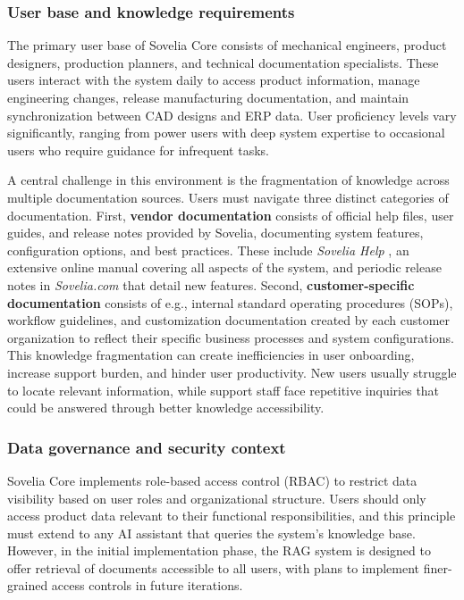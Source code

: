 \subsubsection{User base and knowledge requirements}

The primary user base of Sovelia Core consists of mechanical engineers, product designers, production planners, and technical documentation specialists. These users interact with the system daily to access product information, manage engineering changes, release manufacturing documentation, and maintain synchronization between CAD designs and ERP data. User proficiency levels vary significantly, ranging from power users with deep system expertise to occasional users who require guidance for infrequent tasks.

A central challenge in this environment is the fragmentation of knowledge across multiple documentation sources. Users must navigate three distinct categories of documentation. First, \textbf{vendor documentation} consists of official help files, user guides, and release notes provided by Sovelia, documenting system features, configuration options, and best practices. These include \textit{Sovelia Help} \parencite{noauthor_sovelia_nodate}, an extensive online manual covering all aspects of the system, and periodic release notes in \textit{Sovelia.com} \parencite{noauthor_digital_nodate} that detail new features. Second, \textbf{customer-specific documentation} consists of e.g., internal standard operating procedures (SOPs), workflow guidelines, and customization documentation created by each customer organization to reflect their specific business processes and system configurations. This knowledge fragmentation can create inefficiencies in user onboarding, increase support burden, and hinder user productivity. New users usually struggle to locate relevant information, while support staff face repetitive inquiries that could be answered through better knowledge accessibility.

\subsubsection{Data governance and security context}

Sovelia Core implements role-based access control (RBAC) to restrict data visibility based on user roles and organizational structure. Users should only access product data relevant to their functional responsibilities, and this principle must extend to any AI assistant that queries the system's knowledge base. However, in the initial implementation phase, the RAG system is designed to offer retrieval of documents accessible to all users, with plans to implement finer-grained access controls in future iterations.

